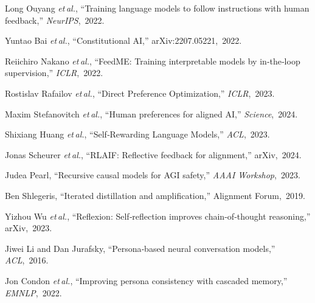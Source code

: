 \documentclass[11pt]{article}
\begin{document}

\begin{thebibliography}{99}
Long Ouyang \textit{et al.}, ``Training language models to follow instructions with human feedback,'' \emph{NeurIPS}, 2022.

Yuntao Bai \textit{et al.}, ``Constitutional AI,'' arXiv:2207.05221, 2022.

Reiichiro Nakano \textit{et al.}, ``FeedME: Training interpretable models by in‑the‑loop supervision,'' \emph{ICLR}, 2022.

Rostislav Rafailov \textit{et al.}, ``Direct Preference Optimization,'' \emph{ICLR}, 2023.

Maxim Stefanovitch \textit{et al.}, ``Human preferences for aligned AI,'' \emph{Science}, 2024.

Shixiang Huang \textit{et al.}, ``Self‑Rewarding Language Models,'' \emph{ACL}, 2023.

Jonas Scheurer \textit{et al.}, ``RLAIF: Reflective feedback for alignment,'' arXiv, 2024.

Judea Pearl, ``Recursive causal models for AGI safety,'' \emph{AAAI Workshop}, 2023.

Ben Shlegeris, ``Iterated distillation and amplification,'' Alignment Forum, 2019.

Yizhou Wu \textit{et al.}, ``Reflexion: Self‑reflection improves chain‑of‑thought reasoning,'' arXiv, 2023.

Jiwei Li and Dan Jurafsky, ``Persona‑based neural conversation models,'' \emph{ACL}, 2016.

Jon Condon \textit{et al.}, ``Improving persona consistency with cascaded memory,'' \emph{EMNLP}, 2022.
\end{thebibliography}
\end{document}
